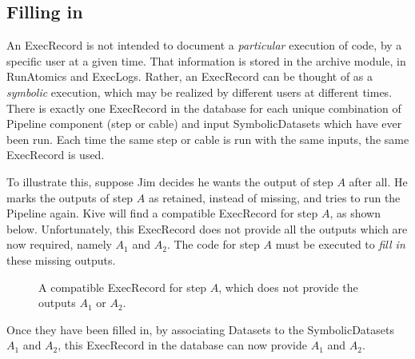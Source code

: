 \documentclass[12pt]{article}
\newcommand{\sd}{\bigcap} %
\newcommand{\sdd}{\bigcapdot} %
\begin{document}
\subsection*{Filling in}

An ExecRecord is not intended to document a \emph{particular} execution of
code, by a specific user at a given time. That information is stored in the
archive module, in RunAtomics and ExecLogs. Rather, an ExecRecord can be
thought of as a \emph{symbolic} execution, which may be realized by different
users at different times. There is exactly one ExecRecord in the database for
each unique combination of Pipeline component (step or cable) and input
SymbolicDatasets which have ever been run. Each time the same step or cable is
run with the same inputs, the same ExecRecord is used.

To illustrate this, suppose Jim decides he wants the output of step $A$ after
all. He marks the outputs of step $A$ as retained, instead of missing, and
tries to run the Pipeline again. Kive will find a compatible ExecRecord for
step $A$, as shown below. Unfortunately, this ExecRecord does not provide all
the outputs which are now required, namely $A_1$ and $A_2$. The code for step
$A$ must be executed to \emph{fill in} these missing outputs.

\begin{figure}[ht]
  \centering
  \caption{A compatible ExecRecord for step $A$, which does not provide the outputs $A_1$ or $A_2$.}
\end{figure}

Once they have been filled in, by associating Datasets to the SymbolicDatasets
$A_1$ and $A_2$, this ExecRecord in the database can now provide $A_1$ and
$A_2$. 
\end{document}

